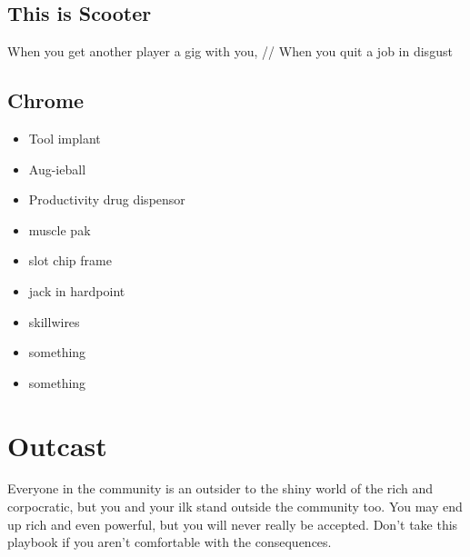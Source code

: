 \documentclass{tufte-book}
\begin{document}
\subsection{This is Scooter}
When you get another player a gig with you, //
When you quit a job in disgust 


\subsection{Chrome}
\begin{multicols}{3}
\begin{itemize}
\item Tool implant
\item Aug-ieball
\item Productivity drug dispensor
\item muscle pak
\item slot chip frame
\item jack in hardpoint
\item skillwires
\item something
\item something
\end{itemize}
\end{multicols}




\section{Outcast} \label{sec:Outcast}

Everyone in the community is an outsider to the shiny world of the rich and corpocratic, but you and your ilk stand outside the community too. You may end up rich and even powerful, but you will never really be accepted. Don't take this playbook if you aren't comfortable with the consequences.

\end{document}
